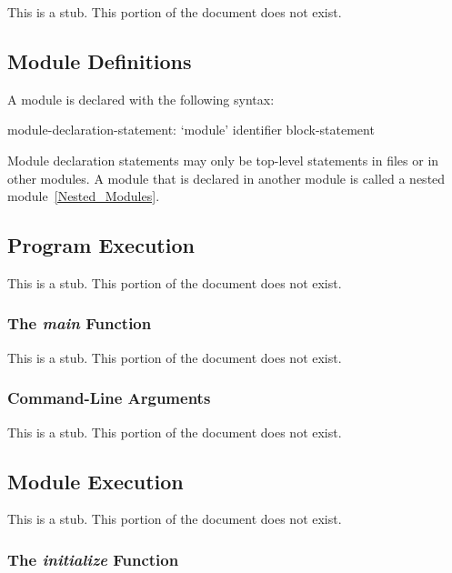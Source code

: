 \label{Modules}

This is a stub.  This portion of the document does not exist.

\subsection{Module Definitions}
\label{Module_Definitions}

A module is declared with the following syntax:
\begin{syntax}
module-declaration-statement:
  `module' identifier block-statement
\end{syntax}

Module declaration statements may only be top-level statements in
files or in other modules.  A module that is declared in another
module is called a nested module~\ref{Nested_Modules}.

\subsection{Program Execution}
\label{Program_Execution}

This is a stub.  This portion of the document does not exist.

\subsubsection{The {\em main} Function}
\label{The_em_main_Function}

This is a stub.  This portion of the document does not exist.

\subsubsection{Command-Line Arguments}
\label{Command-Line_Arguments}

This is a stub.  This portion of the document does not exist.

\subsection{Module Execution}
\label{Module_Execution}

This is a stub.  This portion of the document does not exist.

\subsubsection{The {\em initialize} Function}
\label{The_em_initialize_Function}

